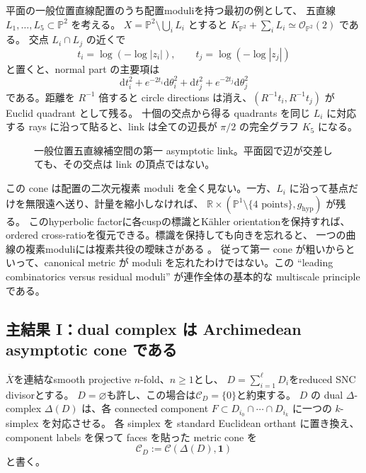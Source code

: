 \documentclass[11pt,a4paper]{ltjsarticle}
\newcommand{\PP}{\mathbb P}
\newcommand{\RR}{\mathbb R}
\newcommand{\dd}{\mathrm d}
\newcommand{\cC}{\mathcal C}
\newcommand{\ov}{\overline}
\theoremstyle{plain}
\theoremstyle{definition}
\theoremstyle{remark}
\begin{document}
平面の一般位置直線配置のうち配置moduliを持つ最初の例として、
五直線 $L_1,\ldots,L_5\subset\PP^2$ を考える。
$X=\PP^2\setminus\bigcup_iL_i$ とすると
$K_{\PP^2}+\sum_iL_i\simeq\mathcal O_{\PP^2}(2)$ である。
交点 $L_i\cap L_j$ の近くで
\[
 t_i=\log(-\log|z_i|),\qquad t_j=\log(-\log|z_j|)
\]
と置くと、normal part の主要項は
\[
 \dd t_i^2+e^{-2t_i}\dd\theta_i^2+
 \dd t_j^2+e^{-2t_j}\dd\theta_j^2
\]
である。距離を $R^{-1}$ 倍すると circle directions は消え、$(R^{-1}t_i,R^{-1}t_j)$ が Euclid quadrant として残る。
十個の交点から得る quadrants を同じ $L_i$ に対応する rays に沿って貼ると、link は全ての辺長が $\pi/2$ の完全グラフ $K_5$ になる。

\begin{figure}[t]
\centering
{}
\caption{一般位置五直線補空間の第一 asymptotic link。平面図で辺が交差しても、その交点は link の頂点ではない。}
\label{fig:K5}
\end{figure}

この cone は配置の二次元複素 moduli を全く見ない。一方、$L_i$ に沿って基点だけを無限遠へ送り、計量を縮小しなければ、
$\RR\times(\PP^1\setminus\{4\text{ points}\},g_{\mathrm{hyp}})$ が残る。
このhyperbolic factorに各cuspの標識とK\"ahler orientationを保持すれば、
ordered cross-ratioを復元できる。標識を保持しても向きを忘れると、
一つの曲線の複素moduliには複素共役の曖昧さがある
\cite[補題\texttt{lem:metric-conjugation}]{UedaII}。
従って第一 cone が粗いからといって、canonical metric が moduli を忘れたわけではない。この ``leading combinatorics versus residual moduli'' が連作全体の基本的な multiscale principle である。

\subsection{主結果 I：dual complex は Archimedean asymptotic cone である}
$\ov X$を連結なsmooth projective $n$-fold、$n\ge1$とし、
$D=\sum_{i=1}^{\ell}D_i$をreduced SNC divisorとする。
$D=\varnothing$も許し、この場合は$\cC_D=\{0\}$と約束する。
$D$ の dual $\Delta$-complex $\Delta(D)$ は、各 connected component
$F\subset D_{i_0}\cap\cdots\cap D_{i_k}$ に一つの $k$-simplex を対応させる。
各 simplex を standard Euclidean orthant に置き換え、component labels を保って faces を貼った metric cone を
\[
 \cC_D:=\cC(\Delta(D),\mathbf 1)
\]
と書く。
\end{document}

